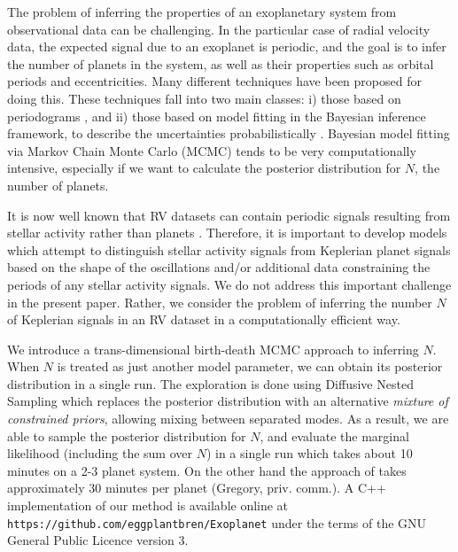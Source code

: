 \documentclass[useAMS,usenatbib]{mn2e}
\begin{document}
The problem of inferring the properties of an
exoplanetary system from observational data can be challenging.
In the particular case of radial velocity data,
the expected signal due to an exoplanet is periodic, and the goal is to
infer the number of planets in the system, as well as their properties such
as orbital periods and eccentricities. Many
different techniques have been proposed for doing this.
These techniques fall into two main
classes: i) those based on periodograms \citep[e.g.][]{2009A&A...496..577Z},
and ii) those based on model fitting in the Bayesian inference framework,
to describe the uncertainties probabilistically
\citep[e.g.][]{2011MNRAS.410...94G, 2014MNRAS.437.3540F,
2011A&A...528L...5T, fengji}. Bayesian model fitting via Markov Chain Monte
Carlo (MCMC) tends to be very computationally intensive, especially if we
want to calculate the posterior distribution for $N$, the number of planets.

It is now well known that RV datasets can contain periodic signals
resulting from stellar activity rather than planets \citep{2014Sci...345..440R}.
Therefore, it is important to develop models which attempt to distinguish
stellar activity signals from Keplerian planet signals based on the shape of
the oscillations and/or additional data constraining the periods of any
stellar activity signals. We do not address this important challenge in the
present paper. Rather, we consider the problem of inferring the number $N$ of
Keplerian signals in an RV dataset in a computationally efficient way.

We introduce a trans-dimensional birth-death MCMC approach
\citep{birthdeath} to inferring $N$.
When $N$ is treated as just another model parameter, we can obtain its
posterior distribution in a single run.
The exploration is done using Diffusive Nested Sampling
\citep[DNS][]{dnest} which replaces the posterior distribution with an alternative
{\it mixture of constrained priors}, allowing mixing between separated modes.
As a result, we are able to sample the posterior distribution for $N$, and
evaluate the marginal likelihood (including the sum over $N$) in
a single run which takes about 10 minutes on a 2-3 planet system.
On the other hand the approach of
\citet{2011MNRAS.410...94G} takes approximately 30 minutes per planet
(Gregory, priv. comm.). A C++ implementation of our method is available online
at {\tt https://github.com/eggplantbren/Exoplanet} under the terms of the
GNU General Public Licence version 3.
\end{document}
